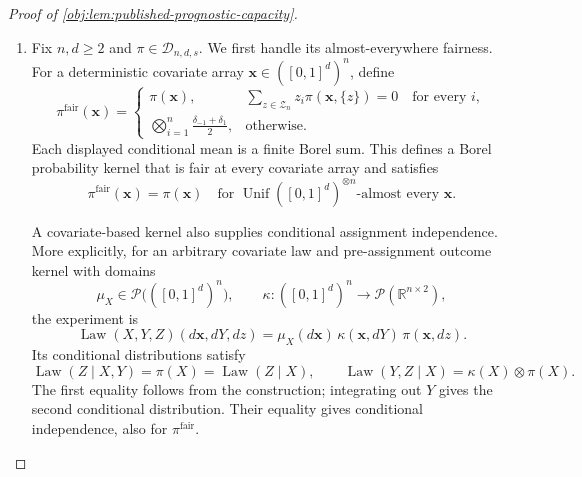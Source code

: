 \begin{proof}[Proof of \cref{obj:lem:published-prognostic-capacity}]
\begin{enumerate}
The outcome diagonal distinguishes this law from every Gaussian completion:
\[
P_{\mathrm{tp}}\{O(0)=O(1)\}=1.
\]
Indeed, in the Gaussian construction, conditioning on \(U\) and \(\varepsilon_0\) gives
\[
\Pr_{P_m}\!\left(O(0)=O(1)\mid U,\varepsilon_0\right)
=
\Pr\!\left(\varepsilon_1=\varepsilon_0-\tau(U)\mid U,\varepsilon_0\right)
=0,
\]
because the independent Gaussian error \(\varepsilon_1\) assigns probability zero to every singleton. Integrating yields
\[
P_m\{O(0)=O(1)\}=0.
\]
Therefore
\[
P_{\mathrm{tp}}\notin\mathcal Q^{\mathrm G}_{d,s},
\qquad
\mathcal Q^{\mathrm G}_{d,s}\subsetneq\mathcal Q_{d,s}.
\]

\item\label{proof:published-prognostic-capacity:excess} Fix \(n,d\geq2\) and \(\pi\in\mathcal D_{n,d,s}\). We first handle its almost-everywhere fairness. For a deterministic covariate array \(\mathbf x\in([0,1]^d)^n\), define
\[
\pi^{\mathrm{fair}}(\mathbf x)=
\begin{cases}
\pi(\mathbf x),
&
\displaystyle
\sum_{z\in\mathcal Z_n}z_i\pi(\mathbf x,\{z\})=0
\quad\text{for every }i,\\[4pt]
\displaystyle
\bigotimes_{i=1}^n\frac{\delta_{-1}+\delta_1}{2},
&\text{otherwise}.
\end{cases}
\]
Each displayed conditional mean is a finite Borel sum. This defines a Borel probability kernel that is fair at every covariate array and satisfies
\[
\pi^{\mathrm{fair}}(\mathbf x)=\pi(\mathbf x)
\quad\text{for }
\operatorname{Unif}([0,1]^d)^{\otimes n}\text{-almost every }\mathbf x.
\]

A covariate-based kernel also supplies conditional assignment independence. More explicitly, for an arbitrary covariate law and pre-assignment outcome kernel with domains
\[
\mu_X\in\mathcal P\bigl(([0,1]^d)^n\bigr),
\qquad
\kappa:([0,1]^d)^n\longrightarrow\mathcal P(\mathbb R^{n\times2}),
\]
the experiment is
\[
\operatorname{Law}(X,Y,Z)(d\mathbf x,dY,dz)
=\mu_X(d\mathbf x)\,\kappa(\mathbf x,dY)\,\pi(\mathbf x,dz).
\]
Its conditional distributions satisfy
\[
\operatorname{Law}(Z\mid X,Y)=\pi(X)
=\operatorname{Law}(Z\mid X),
\qquad
\operatorname{Law}(Y,Z\mid X)=\kappa(X)\otimes\pi(X).
\]
The first equality follows from the construction; integrating out \(Y\) gives the second conditional distribution. Their equality gives conditional independence, also for \(\pi^{\mathrm{fair}}\).


\end{enumerate}
\end{proof}
